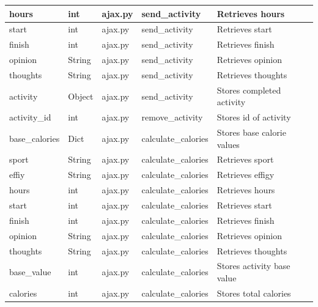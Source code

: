 \documentclass{article}[12pt,a4paper]
\begin{document}
\begin{longtable}{|l|l|l|l|l|}
hours             & int         & ajax.py        & send\_activity      & Retrieves hours                     \\ \hline
start             & int         & ajax.py        & send\_activity      & Retrieves start                     \\ \hline
finish            & int         & ajax.py        & send\_activity      & Retrieves finish                    \\ \hline
opinion           & String      & ajax.py        & send\_activity      & Retrieves opinion                   \\ \hline
thoughts          & String      & ajax.py        & send\_activity      & Retrieves thoughts                  \\ \hline
activity          & Object      & ajax.py        & send\_activity      & Stores completed activity           \\ \hline
activity\_id      & int         & ajax.py        & remove\_activity    & Stores id of activity           \\ \hline
base\_calories    & Dict        & ajax.py        & calculate\_calories & Stores base calorie values          \\ \hline
sport             & String      & ajax.py        & calculate\_calories & Retrieves sport                     \\ \hline
effiy             & String      & ajax.py        & calculate\_calories & Retrieves effigy                    \\ \hline
hours             & int         & ajax.py        & calculate\_calories & Retrieves hours                     \\ \hline
start             & int         & ajax.py        & calculate\_calories & Retrieves start                     \\ \hline
finish            & int         & ajax.py        & calculate\_calories & Retrieves finish                    \\ \hline
opinion           & String      & ajax.py        & calculate\_calories & Retrieves opinion                   \\ \hline
thoughts          & String      & ajax.py        & calculate\_calories & Retrieves thoughts                  \\ \hline
base\_value       & int         & ajax.py        & calculate\_calories & Stores activity base value      \\ \hline
calories          & int         & ajax.py        & calculate\_calories & Stores total calories               \\ \hline

\end{longtable}
\end{document}
